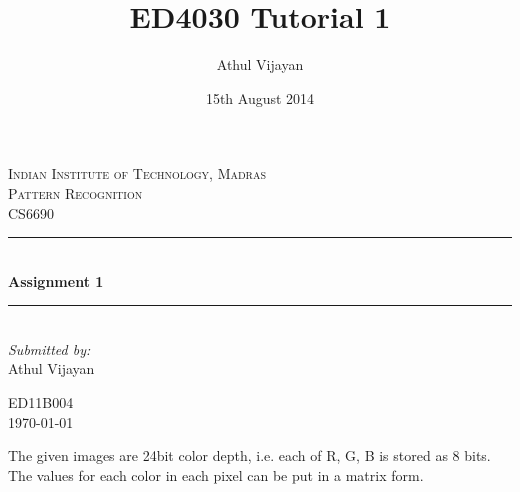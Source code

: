 \documentclass{article}
\title{ED4030 Tutorial 1}
\author{Athul Vijayan}
\date{15th August 2014}
\newcommand{\HRule}{\rule{\linewidth}{0.2mm}} %
\begin{document}
\begin{titlepage}
    \center %
     

    \textsc{\LARGE Indian Institute of Technology, Madras}\\[1.5cm] %
    \textsc{\Large Pattern Recognition}\\[0.5cm] %
    \textsc{\large CS6690}\\[0.5cm] %


    \HRule \\[0.4cm]
    { \huge \bfseries Assignment 1}\\[0.4cm] %
    \HRule \\[1.5cm]
     

    \Large \emph{Submitted by:}\\
    Athul Vijayan %

    ED11B004\\[8cm] %
    {\large \today}\\[6cm] %
    \vfill %
\end{titlepage}
The given images are 24bit color depth, i.e. each of R, G, B is stored as 8 bits. The values for each color in each pixel can be put in a matrix form.
\end{document}
